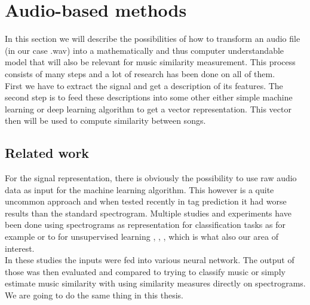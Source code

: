 \chapter{Audio-based methods}
In this section we will describe the possibilities of how to transform an audio file (in our case .wav) into  a mathematically and thus computer understandable model that will also be relevant for music similarity measurement. This process consists of many steps and a lot of research has been done on all of them. \\
First we have to extract the signal and get a description of its features. The second step is to feed these descriptions into some other either simple machine learning or deep learning algorithm to get a vector representation. This vector then will be used to compute similarity between songs. \\


\section{Related work}
For the signal representation, there is obviously the possibility to use raw audio data as input for the machine learning algorithm. This however is a quite uncommon approach and when tested recently in tag prediction \cite{6854950} it had worse results than the standard spectrogram. Multiple studies and experiments have been done using spectrograms as representation for classification tasks as for example \cite{wang2014improving} or to for unsupervised learning \cite{van2013deep}, \cite{Ramakrishnan2017song2V}, \cite{NIPS2009_3674}, which is what also our area of interest. \\
In these studies the inputs were fed into various neural network. The output of those was then evaluated and compared to trying to classify music or simply estimate music similarity with using similarity measures directly on spectrograms. We are going to do the same thing in this thesis.
